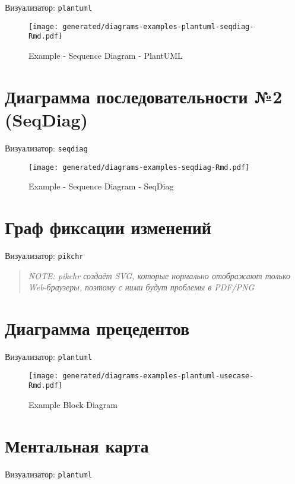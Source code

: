 \documentclass[12pt,a4paper,12pt,oneside,openany]{book}
\begin{document}
Визуализатор: \texttt{plantuml}

\begin{figure}
\centering
\texttt{[image: generated/diagrams-examples-plantuml-seqdiag-Rmd.pdf]}
\caption{Example - Sequence Diagram - PlantUML}
\end{figure}

\newpage

\section{Диаграмма последовательности №2 (SeqDiag)}\label{--2-seqdiag}

Визуализатор: \texttt{seqdiag}

\begin{figure}
\centering
\texttt{[image: generated/diagrams-examples-seqdiag-Rmd.pdf]}
\caption{Example - Sequence Diagram - SeqDiag}
\end{figure}

\newpage

\section{Граф фиксации изменений}\label{--}

Визуализатор: \texttt{pikchr}

\begin{quote}
\emph{NOTE: pikchr создаёт SVG, которые нормально отображают только Web-браузеры, поэтому с ними будут проблемы в PDF/PNG}
\end{quote}

\newpage

\section{Диаграмма прецедентов}\label{-}

Визуализатор: \texttt{plantuml}

\begin{figure}
\centering
\texttt{[image: generated/diagrams-examples-plantuml-usecase-Rmd.pdf]}
\caption{Example Block Diagram}
\end{figure}

\newpage

\section{Ментальная карта}\label{-}

Визуализатор: \texttt{plantuml}
\end{document}
